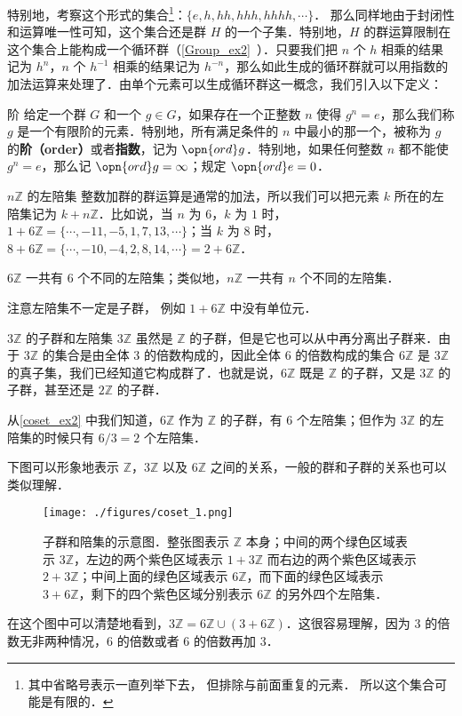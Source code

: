 特别地，考察这个形式的集合\footnote{其中省略号表示一直列举下去， 但排除与前面重复的元素． 所以这个集合可能是有限的．}：$\{e, h, hh, hhh, hhhh, \cdots\}$． 那么同样地由于封闭性和运算唯一性可知，这个集合还是群 $H$ 的一个子集．特别地，$H$ 的群运算限制在这个集合上能构成一个循环群（\autoref{Group_ex2}~）．只要我们把 $n$ 个 $h$ 相乘的结果记为 $h^n$，$n$ 个 $h^{-1}$ 相乘的结果记为 $h^{-n}$，那么如此生成的循环群就可以用指数的加法运算来处理了．由单个元素可以生成循环群这一概念，我们引入以下定义：

\begin{definition}{阶}
给定一个群 $G$ 和一个 $g\in G$，如果存在一个正整数 $n$ 使得 $g^n=e$，那么我们称 $g$ 是一个有限阶的元素．特别地，所有满足条件的 $n$ 中最小的那一个，被称为 $g$ 的\textbf{阶（order）}或者\textbf{指数}，记为 $\opn{ord}g$．特别地，如果任何整数 $n$ 都不能使 $g^n=e$，那么记 $\opn{ord}g=\infty$；规定 $\opn{ord}e=0$．
\end{definition}

\begin{example}{$n\mathbb{Z}$ 的左陪集}\label{coset_ex2}
整数加群的群运算是通常的加法，所以我们可以把元素 $k$ 所在的左陪集记为 $k+n\mathbb{Z}$．比如说，当 $n$ 为 $6$，$k$ 为 $1$ 时，$1+6\mathbb{Z}=\{\cdots, -11, -5, 1, 7, 13, \cdots\}$；当 $k$ 为 $8$ 时，$8+6\mathbb{Z}=\{\cdots, -10, -4, 2, 8, 14, \cdots\}=2+6\mathbb{Z}$．

$6\mathbb{Z}$ 一共有 $6$ 个不同的左陪集；类似地，$n\mathbb{Z}$ 一共有 $n$ 个不同的左陪集．
\end{example}
注意左陪集不一定是子群， 例如 $1 + 6\mathbb Z$ 中没有单位元．

\begin{example}{$3\mathbb{Z}$ 的子群和左陪集}\label{coset_ex3}
$3\mathbb{Z}$ 虽然是 $\mathbb{Z}$ 的子群，但是它也可以从中再分离出子群来．由于 $3\mathbb{Z}$ 的集合是由全体 $3$ 的倍数构成的，因此全体 $6$ 的倍数构成的集合 $6\mathbb{Z}$ 是 $3\mathbb{Z}$ 的真子集，我们已经知道它构成群了．也就是说，$6\mathbb{Z}$ 既是 $\mathbb{Z}$ 的子群，又是 $3\mathbb{Z}$ 的子群，甚至还是 $2\mathbb{Z}$ 的子群．

从\autoref{coset_ex2} 中我们知道，$6\mathbb{Z}$ 作为 $\mathbb{Z}$ 的子群，有 $6$ 个左陪集；但作为 $3\mathbb{Z}$ 的左陪集的时候只有 $6/3=2$ 个左陪集．

下图可以形象地表示 $\mathbb{Z}$，$3\mathbb{Z}$ 以及 $6\mathbb{Z}$ 之间的关系，一般的群和子群的关系也可以类似理解．

\begin{figure}[ht]
\centering
\texttt{[image: ./figures/coset\_1.png]}
\caption{子群和陪集的示意图．整张图表示 $\mathbb{Z}$ 本身；中间的两个绿色区域表示 $3\mathbb{Z}$，左边的两个紫色区域表示 $1+3\mathbb{Z}$ 而右边的两个紫色区域表示 $2+3\mathbb{Z}$；中间上面的绿色区域表示 $6\mathbb{Z}$，而下面的绿色区域表示 $3+6\mathbb{Z}$，剩下的四个紫色区域分别表示 $6\mathbb{Z}$ 的另外四个左陪集．} \label{coset_fig1}
\end{figure}

在这个图中可以清楚地看到，$3\mathbb{Z}=6\mathbb{Z}\cup(3+6\mathbb{Z})$．这很容易理解，因为 $3$ 的倍数无非两种情况，$6$ 的倍数或者 $6$ 的倍数再加 $3$．

\end{example}

